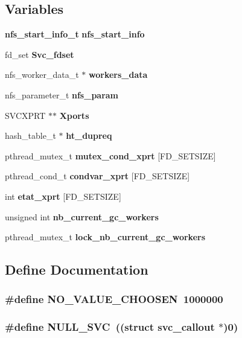 \subsection*{Variables}
\begin{CompactItemize}
\item 
{\bf nfs\_\-start\_\-info\_\-t} {\bf nfs\_\-start\_\-info}
\item 
fd\_\-set {\bf Svc\_\-fdset}
\item 
nfs\_\-worker\_\-data\_\-t $\ast$ {\bf workers\_\-data}
\item 
nfs\_\-parameter\_\-t {\bf nfs\_\-param}
\item 
SVCXPRT $\ast$$\ast$ {\bf Xports}
\item 
hash\_\-table\_\-t $\ast$ {\bf ht\_\-dupreq}
\item 
pthread\_\-mutex\_\-t {\bf mutex\_\-cond\_\-xprt} [FD\_\-SETSIZE]
\item 
pthread\_\-cond\_\-t {\bf condvar\_\-xprt} [FD\_\-SETSIZE]
\item 
int {\bf etat\_\-xprt} [FD\_\-SETSIZE]
\item 
unsigned int {\bf nb\_\-current\_\-gc\_\-workers}
\item 
pthread\_\-mutex\_\-t {\bf lock\_\-nb\_\-current\_\-gc\_\-workers}
\end{CompactItemize}


\subsection{Define Documentation}
\subsubsection[{NO\_\-VALUE\_\-CHOOSEN}]{\setlength{\rightskip}{0pt plus 5cm}\#define NO\_\-VALUE\_\-CHOOSEN~1000000}\label{nfs__rpc__dispatcher__thread_8c_25424ceb074d9f56b67d1ff02ad8734d}


\subsubsection[{NULL\_\-SVC}]{\setlength{\rightskip}{0pt plus 5cm}\#define NULL\_\-SVC~((struct svc\_\-callout $\ast$)0)}\label{nfs__rpc__dispatcher__thread_8c_beb67fae7e2b65e73240da098c71fc61}




